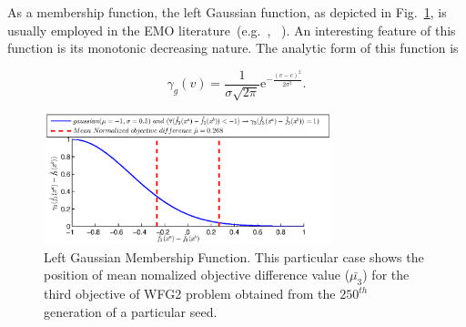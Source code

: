 \documentclass[review]{elsarticle}
\begin{document}
As a membership function, the left Gaussian function, as depicted in Fig.~\ref{fig:leftgaussianupdated}, is usually employed in the EMO literature~(e.g.~\citep{he2014fuzzy}, ~\citep{farina2004fuzzy}). An interesting feature of this function is its monotonic decreasing nature. The analytic form of this function is 

\begin{equation} \label{eq:gaussianeqn}
\gamma_g(v)=\frac{1}{\sigma\sqrt{2\pi}}\mathrm{e}^{-\frac{(v-c)^2}{2\sigma^2}}.
\end{equation}

\begin{figure}[htbp] 
\centering 
   		
\includegraphics[width=3.3in,height=1.50in]{figures/relatedworks/Ngaussianfunctionwfg2_3.eps}

\caption{Left Gaussian Membership Function. This particular case shows the position of mean nomalized objective difference value ($\bar{\mu_3}$) for the third  objective of WFG2 problem obtained from the $250^{th}$ generation of a particular seed.}
\label{fig:leftgaussianupdated}
\end{figure}
\end{document}
